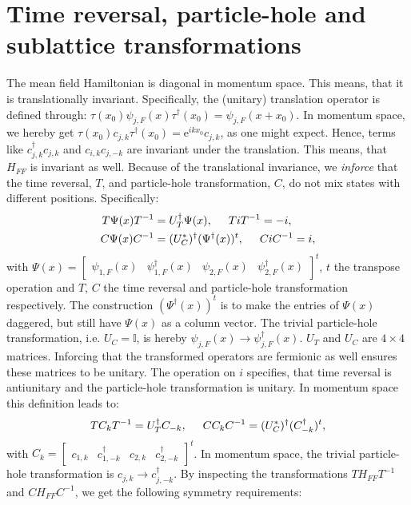 \section{Time reversal, particle-hole and sublattice transformations}
\label{sec.SymmetriesTRandPH}
The mean field Hamiltonian is diagonal in momentum space. This means, that it is translationally invariant. Specifically, the (unitary) translation operator is defined through: $\tau(x_0)\psi_{j,F}(x)\tau^\dagger (x_0) = \psi_{j,F}(x + x_0)$. In momentum space, we hereby get $\tau(x_0) c_{j,k} \tau^\dagger(x_0) = \text{e}^{ikx_0}c_{j,k}$, as one might expect. Hence, terms like $c^\dagger_{j,k} c_{j,k}$ and $c_{i,k}c_{j,-k}$ are invariant under the translation. This means, that $H_{FF}$ is invariant as well. Because of the translational invariance, we \textit{inforce} that the time reversal, $T$, and particle-hole transformation, $C$, do not mix states with different positions. Specifically:
\begin{align}
T \Psi(x) T^{-1} &= U^\dagger_T \Psi(x), \hspace{0.5cm} TiT^{-1} = -i, \nonumber \\
C \Psi(x) C^{-1} &= (U^*_C)^\dagger (\Psi^\dagger(x))^t, \hspace{0.5cm} CiC^{-1} = i, 
\label{eq.TRandPH.realspace}
\end{align}
with $\Psi(x) = \begin{bmatrix} \psi_{1,F}(x) & \psi^\dagger_{1,F}(x) & \psi_{2,F}(x) & \psi^\dagger_{2,F}(x) \end{bmatrix}^t$, $t$ the transpose operation and $T$, $C$ the time reversal and particle-hole transformation respectively. The construction $(\Psi^\dagger(x))^t$ is to make the entries of $\Psi(x)$ daggered, but still have $\Psi(x)$ as a column vector. The trivial particle-hole transformation, i.e. $U_C = \mathbb{I}$, is hereby $\psi_{j,F}(x) \to \psi^\dagger_{j,F}(x)$. $U_T$ and $U_C$ are $4\times 4$ matrices. Inforcing that the transformed operators are fermionic as well ensures these matrices to be unitary. The operation on $i$ specifies, that time reversal is antiunitary and the particle-hole transformation is unitary. In momentum space this definition leads to:
\begin{equation}
T C_k T^{-1} = U^\dagger_T C_{-k}, \hspace{0.5cm} C C_k C^{-1} = (U^*_C)^\dagger (C^\dagger_{-k})^t,  
\label{eq.TRandPH.momentumspace}
\end{equation}
with $C_k = \begin{bmatrix} c_{1,k} & c^\dagger_{1,-k} & c_{2,k} & c^\dagger_{2,-k} \end{bmatrix}^t$. In momentum space, the trivial particle-hole transformation is $c_{j,k} \to c^\dagger_{j,-k}$. By inspecting the transformations $TH_{FF}T^{-1}$ and $CH_{FF}C^{-1}$, we get the following symmetry requirements:
